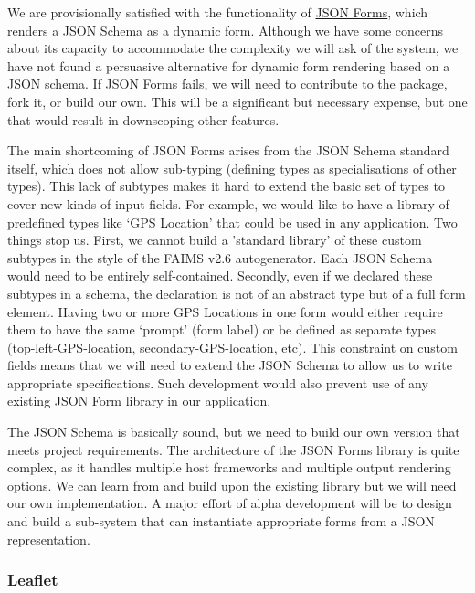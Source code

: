\documentclass{faims3_report}
\begin{document}
We are provisionally satisfied with the functionality of
\href{https://jsonforms.io/}{{JSON Forms}}, which renders a JSON Schema
as a dynamic form. Although we have some concerns about its capacity to
accommodate the complexity we will ask of the system, we have not found
a persuasive alternative for dynamic form rendering based on a JSON
schema. If JSON Forms fails, we will need to contribute to the package,
fork it, or build our own. This will be a significant but necessary
expense, but one that would result in downscoping other features.

The main shortcoming of JSON Forms arises from the JSON Schema standard
itself, which does not allow sub-typing (defining types as
specialisations of other types). This lack of subtypes makes it hard to
extend the basic set of types to cover new kinds of input fields. For
example, we would like to have a library of predefined types like `GPS
Location' that could be used in any application. Two things stop us.
First, we cannot build a 'standard library' of these custom subtypes in
the style of the FAIMS v2.6 autogenerator. Each JSON Schema would need
to be entirely self-contained. Secondly, even if we declared these
subtypes in a schema, the declaration is not of an abstract type but of
a full form element. Having two or more GPS Locations in one form would
either require them to have the same `prompt' (form label) or be defined
as separate types (top-left-GPS-location, secondary-GPS-location, etc).
This constraint on custom fields means that we will need to extend the
JSON Schema to allow us to write appropriate specifications. Such
development would also prevent use of any existing JSON Form library in
our application.

The JSON Schema is basically sound, but we need to build our own version
that meets project requirements. The architecture of the JSON Forms
library is quite complex, as it handles multiple host frameworks and
multiple output rendering options. We can learn from and build upon the
existing library but we will need our own implementation. A major effort
of alpha development will be to design and build a sub-system that can
instantiate appropriate forms from a JSON representation.

\subsubsection{Leaflet}
\end{document}
